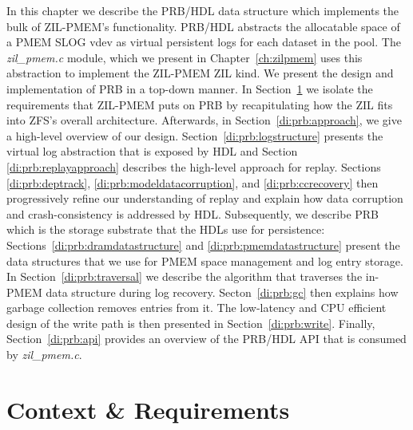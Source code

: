\documentclass[12pt,a4paper,twoside]{book}
\begin{document}
In this chapter we describe the PRB/HDL data structure which implements the bulk of ZIL-PMEM's functionality.
PRB/HDL abstracts the allocatable space of a PMEM SLOG vdev as virtual persistent logs for each dataset in the pool.
The \textit{zil\_pmem.c} module, which we present in Chapter~\ref{ch:zilpmem} uses this abstraction to implement the ZIL-PMEM ZIL kind.
We present the design and implementation of PRB in a top-down manner.
In Section~\ref{di:prb:analysis} we isolate the requirements that ZIL-PMEM puts on PRB by recapitulating how the ZIL fits into ZFS's overall architecture.
Afterwards, in Section~\ref{di:prb:approach}, we give a high-level overview of our design.
Section~\ref{di:prb:logstructure} presents the virtual log abstraction that is exposed by HDL and Section \ref{di:prb:replayapproach} describes the high-level approach for replay.
Sections \ref{di:prb:deptrack}, \ref{di:prb:modeldatacorruption}, and \ref{di:prb:ccrecovery} then progressively refine our understanding of replay and explain how data corruption and crash-consistency is addressed by HDL.
Subsequently, we describe PRB which is the storage substrate that the HDLs use for persistence:
Sections~\ref{di:prb:dramdatastructure} and \ref{di:prb:pmemdatastructure} present the data structures that we use for PMEM space management and log entry storage.
In Section~\ref{di:prb:traversal} we describe the algorithm that traverses the in-PMEM data structure during log recovery.
Secton~\ref{di:prb:gc} then explains how garbage collection removes entries from it.
The low-latency and CPU efficient design of the write path is then presented in Section~\ref{di:prb:write}.
Finally, Section~\ref{di:prb:api} provides an overview of the PRB/HDL API that is consumed by \textit{zil\_pmem.c}.

\section{Context \& Requirements}\label{di:prb:analysis}
\end{document}

